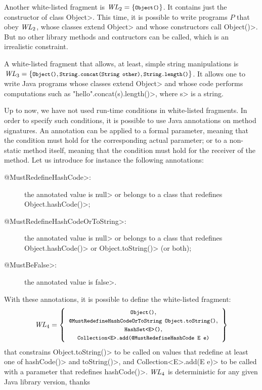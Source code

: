 Another white-listed fragment is $\wl_2=\{\<Object()>\}$. It contains
just the constructor of class \<Object>. This time, it is possible to write programs $P$
that obey $\mathit{WL}_2$, whose classes extend \<Object> and whose constructors call \<Object()>.
But no other library methods and contructors can be called, which is an irrealistic
constraint.

A white-listed fragment that allows, at least, simple string manipulations is
$\wl_3=\{\<Object()>,\<String.concat(String other)>,\<String.length()>\}$. It allows one
to write Java programs whose classes extend \<Object> and whose code performs computations
such as \<"hello".concat(s).length()>, where \<s> is a string.

Up to now, we have not used run-time conditions in white-listed fragments.
In order to specify such conditions, it is possible to use Java annotations on
method signatures. An annotation can be applied to a formal parameter, meaning that
the condition must hold for the corresponding actual parameter; or to a non-static method
itself, meaning that the condition must hold for the receiver of the method.
Let us introduce for instance the following annotations:
%
\begin{description}
\item[\<@MustRedefineHashCode>:] the annotated value is \<null> or belongs to a class that redefines
  \<Object.hashCode()>;
\item[\<@MustRedefineHashCodeOrToString>:] the annotated value is \<null> or belongs to a class that redefines
  \<Object.hashCode()> or \<Object.toString()> (or both);
\item[\<@MustBeFalse>:] the annotated value is \<false>.
\end{description}
%
With these annotations, it is possible to define the white-listed fragment:
%
\[
\wl_4=\left\{\begin{array}{c}
\mbox{\<Object()>},\\
\mbox{\<@MustRedefineHashCodeOrToString Object.toString()>},\\
\mbox{\<HashSet$\text{<}$E$\text{>}$()>},\\
\mbox{\<Collection$\text{<}$E$\text{>}$.add(@MustRedefineHashCode E e)>}
\end{array}\right\}
\]
%
that constrains \<Object.toString()> to be called on values that redefine
at least one of \<hashCode()> and \<toString()>, and
\<Collection$\text{<}$E$\text{>}$.add(E e)> to be called
with a parameter that redefines \<hashCode()>. $\mathit{WL}_4$ is deterministic
for any given Java library version, thanks
